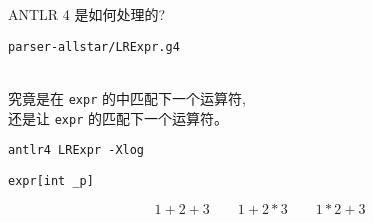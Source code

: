 
\begin{frame}{}
  \begin{center}
    \Large{ANTLR 4 是如何处理的?}
  \end{center}
\end{frame}

\begin{frame}{}
  \begin{center}
    \texttt{parser-allstar/LRExpr.g4}

    \vspace{0.30cm}
  \end{center}
\end{frame}

\begin{frame}{}
  \begin{center}
     \\[10pt]
    究竟是在 \texttt{expr} 的中匹配下一个运算符, \\[15pt]
    还是让 \texttt{expr} 的匹配下一个运算符。

    \pause
    \vspace{0.80cm}
    \texttt{antlr4 LRExpr -Xlog}
  \end{center}
\end{frame}

\begin{frame}{}
  \begin{center}

  \pause
  \end{center}
\end{frame}

\begin{frame}{}

  \begin{center}
	\texttt{expr[int \_p]}
  \end{center}

\end{frame}

\begin{frame}{}

  \[
	1 + 2 + 3 \qquad 1 + 2 \ast 3 \qquad 1 * 2 + 3
  \]
\end{frame}

